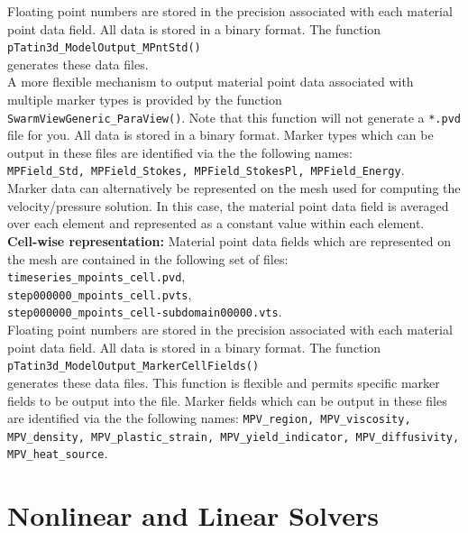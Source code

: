 \documentclass[paper=a4, fontsize=11pt,twoside]{scrartcl}
\newcommand{\unix}[1]{\texttt{\footnotesize #1}}
\begin{document}
{{\begin{small}
Floating point numbers are stored in the precision associated with each material point data field. All data is stored in a binary format. The function \\
\unix{pTatin3d\_ModelOutput\_MPntStd()} \\
generates these data files.
\\[8pt]
A more flexible mechanism to output material point data associated with multiple marker types is provided by the function \unix{SwarmViewGeneric\_ParaView()}. Note that this function will not generate a \texttt{*.pvd} file for you.  All data is stored in a binary format. Marker types which can be output in these files are identified via the the following names: \\
\unix{MPField\_Std, MPField\_Stokes, MPField\_StokesPl, MPField\_Energy}.
\\[8pt]
Marker data can alternatively be represented on the mesh used for computing the velocity/pressure solution. 
In this case, the material point data field is averaged over each element and represented as a constant value within each element.
\\[8pt]
{\bf Cell-wise representation:} Material point data fields which are represented on the mesh are contained in the following set of files:\\
\unix{timeseries\_mpoints\_cell.pvd}, \\
\unix{step000000\_mpoints\_cell.pvts}, \\
\unix{step000000\_mpoints\_cell-subdomain00000.vts}. \\
Floating point numbers are stored in the precision associated with each material point data field. All data is stored in a binary format.
The function \\
	\unix{pTatin3d\_ModelOutput\_MarkerCellFields()} \\
generates these data files. This function is flexible and permits specific marker fields to be output into the file. Marker fields which can be output in these files are identified via the the following names:
\unix{MPV\_region, MPV\_viscosity, MPV\_density, MPV\_plastic\_strain, MPV\_yield\_indicator, MPV\_diffusivity, MPV\_heat\_source}.

\newpage
\section{Nonlinear and Linear Solvers}


\end{small}}}
\end{document}
